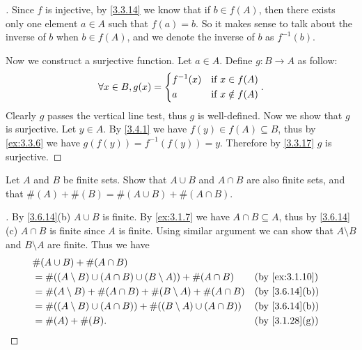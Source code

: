 \begin{proof}[]
	Since \(f\) is injective, by \cref{3.3.14} we know that if \(b \in f(A)\), then there exists only one element \(a \in A\) such that \(f(a) = b\).
	So it makes sense to talk about the inverse of \(b\) when \(b \in f(A)\), and we denote the inverse of \(b\) as \(f^{-1}(b)\).

	Now we construct a surjective function.
	Let \(a \in A\).
	Define \(g : B \to A\) as follow:
	\[
		\forall x \in B, g(x) = \begin{dcases}
			f^{-1}(x) & \text{if } x \in f(A)    \\
			a         & \text{if } x \notin f(A)
		\end{dcases}.
	\]
	Clearly \(g\) passes the vertical line test, thus \(g\) is well-defined.
	Now we show that \(g\) is surjective.
	Let \(y \in A\).
	By \cref{3.4.1} we have \(f(y) \in f(A) \subseteq B\), thus by \cref{ex:3.3.6} we have \(g(f(y)) = f^{-1}(f(y)) = y\).
	Therefore by \cref{3.3.17} \(g\) is surjective.
\end{proof}

\begin{ex}\label{ex:3.6.9}
	Let \(A\) and \(B\) be finite sets.
	Show that \(A \cup B\) and \(A \cap B\) are also finite sets, and that \(\#(A) + \#(B) = \#(A \cup B) + \#(A \cap B)\).
\end{ex}

\begin{proof}[]
	By \cref{3.6.14}(b) \(A \cup B\) is finite.
	By \cref{ex:3.1.7} we have \(A \cap B \subseteq A\), thus by \cref{3.6.14}(c) \(A \cap B\) is finite since \(A\) is finite.
	Using similar argument we can show that \(A \setminus B\) and \(B \setminus A\) are finite.
	Thus we have
	\begin{align*}
		 & \#(A \cup B) + \#(A \cap B)                                                                     \\
		 & = \#((A \setminus B) \cup (A \cap B) \cup (B \setminus A)) + \#(A \cap B)   &  & \by{ex:3.1.10} \\
		 & = \#(A \setminus B) + \#(A \cap B) + \#(B \setminus A) + \#(A \cap B)       &  & \by{3.6.14}[b] \\
		 & = \#((A \setminus B) \cup (A \cap B)) + \#((B \setminus A) \cup (A \cap B)) &  & \by{3.6.14}[b] \\
		 & = \#(A) + \#(B).                                                            &  & \by{3.1.28}[g]
	\end{align*}
\end{proof}

